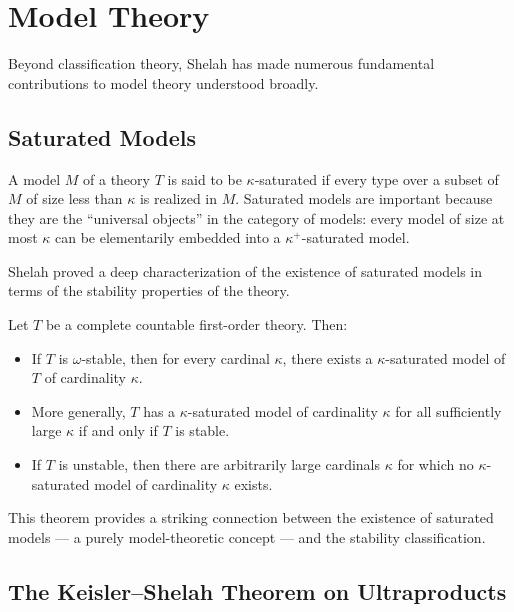 \section{Model Theory}

Beyond classification theory, Shelah has made numerous fundamental contributions to model theory understood broadly.

\subsection{Saturated Models}

A model \(M\) of a theory \(T\) is said to be \(\kappa\)-saturated if every type over a subset of \(M\) of size less than \(\kappa\) is realized in \(M\). Saturated models are important because they are the ``universal objects'' in the category of models: every model of size at most \(\kappa\) can be elementarily embedded into a \(\kappa^{+}\)-saturated model.

Shelah proved a deep characterization of the existence of saturated models in terms of the stability properties of the theory.

\begin{theorem}
Let \(T\) be a complete countable first-order theory. Then:
\begin{itemize}
    \item If \(T\) is \(\omega\)-stable, then for every cardinal \(\kappa\), there exists a \(\kappa\)-saturated model of \(T\) of cardinality \(\kappa\).
    \item More generally, \(T\) has a \(\kappa\)-saturated model of cardinality \(\kappa\) for all sufficiently large \(\kappa\) if and only if \(T\) is stable.
    \item If \(T\) is unstable, then there are arbitrarily large cardinals \(\kappa\) for which no \(\kappa\)-saturated model of cardinality \(\kappa\) exists.
\end{itemize}
\end{theorem}

This theorem provides a striking connection between the existence of saturated models --- a purely model-theoretic concept --- and the stability classification.

\subsection{The Keisler--Shelah Theorem on Ultraproducts}

